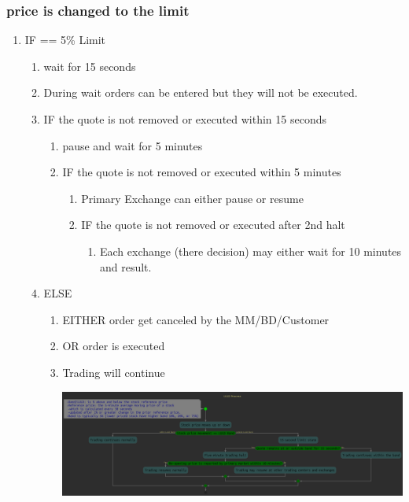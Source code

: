 \documentclass[11pt]{article}
\begin{document}
\subsubsection{price is changed to the limit}
\label{sec:orgeffd1b4}
\begin{enumerate}
\item IF == 5\% Limit
\label{sec:org2742a31}
\begin{enumerate}
\item wait for 15 seconds
\label{sec:org93991f8}
\item During wait orders can be entered but they will not be executed.
\label{sec:org56cd5d1}
\item IF the quote is not removed or executed within 15 seconds
\label{sec:orgf054c32}
\begin{enumerate}
\item pause and wait for 5 minutes
\label{sec:org66f5f0d}
\item IF the quote is not removed or executed within 5 minutes
\label{sec:orgdb64fb5}
\begin{enumerate}
\item Primary Exchange can either pause or resume
\label{sec:org7d82f94}
\item IF the quote is not removed or executed after 2nd halt
\label{sec:orgfba45a3}
\begin{enumerate}
\item Each exchange (there decision) may either wait for 10 minutes and result.
\label{sec:orge01c32a}
\end{enumerate}
\end{enumerate}
\end{enumerate}
\item ELSE
\label{sec:org9950ffb}
\begin{enumerate}
\item EITHER order get canceled by the MM/BD/Customer
\label{sec:orgf9c31a3}
\item OR     order is executed
\label{sec:org2068f75}
\item Trading will continue
\label{sec:org3379925}

\begin{center}
\includegraphics[width=.9\linewidth]{./LULD.png}
\end{center}
\end{enumerate}
\end{enumerate}
\end{enumerate}
\end{document}
